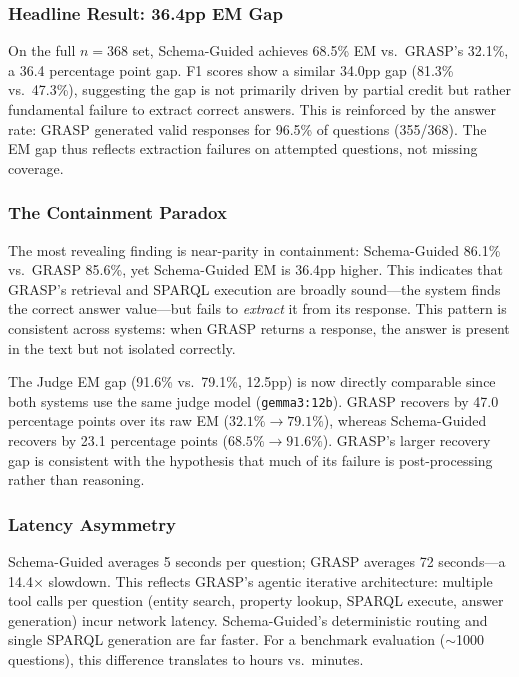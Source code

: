 \subsubsection{Headline Result: 36.4pp EM Gap}

On the full $n=368$ set, Schema-Guided achieves 68.5\% EM vs.\ GRASP's 32.1\%, a 36.4 percentage point gap. F1 scores show a similar 34.0pp gap (81.3\% vs.\ 47.3\%), suggesting the gap is not primarily driven by partial credit but rather fundamental failure to extract correct answers. This is reinforced by the answer rate: GRASP generated valid responses for 96.5\% of questions (355/368). The EM gap thus reflects extraction failures on attempted questions, not missing coverage.

\subsubsection{The Containment Paradox}

The most revealing finding is near-parity in containment: Schema-Guided 86.1\% vs.\ GRASP 85.6\%, yet Schema-Guided EM is 36.4pp higher. This indicates that GRASP's retrieval and SPARQL execution are broadly sound—the system finds the correct answer value—but fails to \textit{extract} it from its response. This pattern is consistent across systems: when GRASP returns a response, the answer is present in the text but not isolated correctly.

The Judge EM gap (91.6\% vs.\ 79.1\%, 12.5pp) is now directly comparable since both systems use the same judge model (\texttt{gemma3:12b}). GRASP recovers by 47.0 percentage points over its raw EM ($32.1\% \to 79.1\%$), whereas Schema-Guided recovers by 23.1 percentage points ($68.5\% \to 91.6\%$). GRASP's larger recovery gap is consistent with the hypothesis that much of its failure is post-processing rather than reasoning.

\subsubsection{Latency Asymmetry}

Schema-Guided averages 5 seconds per question; GRASP averages 72 seconds—a 14.4$\times$ slowdown. This reflects GRASP's agentic iterative architecture: multiple tool calls per question (entity search, property lookup, SPARQL execute, answer generation) incur network latency. Schema-Guided's deterministic routing and single SPARQL generation are far faster. For a benchmark evaluation ($\sim$1000 questions), this difference translates to hours vs.\ minutes.

